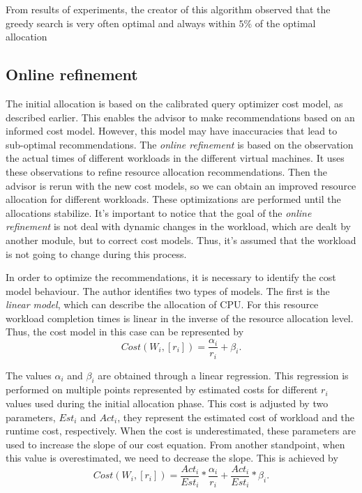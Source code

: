 From results of experiments, the creator of this algorithm observed that the greedy search is very often optimal and always within $5\%$ of the optimal allocation



\subsection{Online refinement}

The initial allocation is based on the calibrated query optimizer cost model, as described earlier. This enables the advisor to make recommendations based on an informed cost model. However, this model may have inaccuracies that lead to sub-optimal recommendations. The  \textit{online refinement} is based on the observation the actual times of different workloads in the different virtual machines. It uses these observations to refine resource allocation recommendations. Then the advisor is rerun with the new cost models, so  we can obtain an improved resource allocation for different workloads. These optimizations are performed until the allocations stabilize. It's important to notice that the goal of the \textit{online refinement} is not deal with dynamic changes in the workload, which are dealt by another module, but to correct cost models. Thus, it's assumed that the workload is not going to change during this process. 

In order to optimize the recommendations, it is necessary to identify the cost model behaviour. The author identifies two types of models. The first is the \textit{linear model}, which can describe the allocation of CPU. For this resource workload completion times is linear in the inverse of the resource allocation level. Thus, the cost model in this case can be represented by
\[
 Cost(W_{i}, [r_{i}]) = \frac{\alpha_{i}}{r_{i}} +\beta_{i}.
\]

The values $\alpha_{i}$ and $\beta_{i}$ are obtained through a linear regression. This regression is performed on multiple points represented by estimated costs for different $r_{i}$ values used during the initial allocation phase. This cost is adjusted by two parameters, $Est_{i}$ and $Act_{i}$, they represent the estimated cost of workload and the runtime cost, respectively. When the cost is underestimated, these parameters are used to increase the slope of our cost equation. From another standpoint, when this value is overestimated, we need to decrease the slope. This is achieved by
\[
  Cost(W_{i}, [r_{i}]) = \frac{Act_{i}}{Est_{i}} * \frac{\alpha_{i}}{r_{i}} + \frac{Act_{i}}{Est_{i}} * \beta_{i}.
\]

